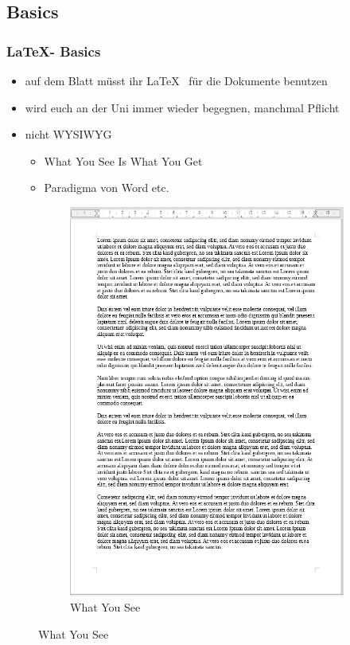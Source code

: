\documentclass[18pt]{beamer}
\begin{document}
	\subsection{Basics}
	\begin{frame}
		\frametitle{\LaTeX - Basics}
		\begin{itemize}
			\item auf dem Blatt müsst ihr \LaTeX  ~ für die Dokumente benutzen
			\item wird euch an der Uni immer wieder begegnen, manchmal Pflicht
			\pause
			\item nicht WYSIWYG
			\begin{itemize}
				\item What You See Is What You Get
				\item Paradigma von Word etc.
			\end{itemize}
		\end{itemize}
		\begin{figure}
			\begin{subfigure}{0.5\textwidth}
				\centering
				\caption{\small What You See}
				\includegraphics[scale=0.2]{pics/tut1/wysiwyg_raw.PNG}

\end{subfigure}
\end{figure}
\end{frame}
\end{document}
